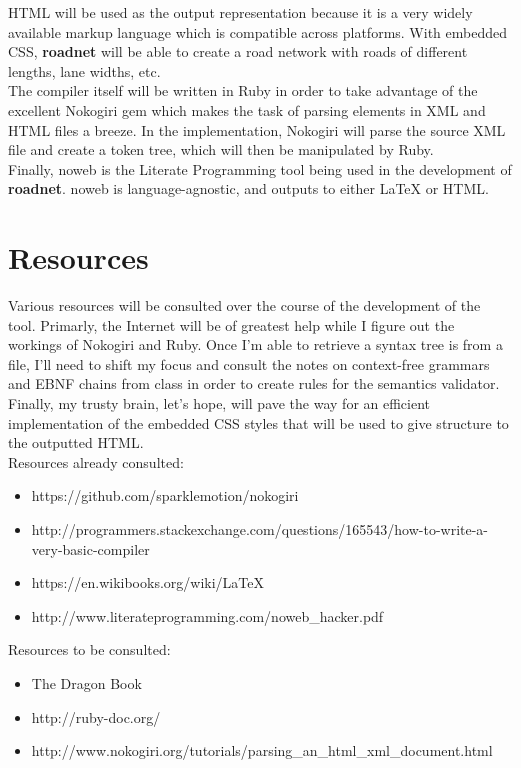 \documentclass{article}%
\begin{document}
HTML will be used as the output representation because it is a very widely available markup language which is compatible across platforms. With embedded CSS, \textbf{roadnet} will be able to create a road network with roads of different lengths, lane widths, etc.\\

The compiler itself will be written in Ruby in order to take advantage of the excellent Nokogiri gem which makes the task of parsing elements in XML and HTML files a breeze. In the implementation, Nokogiri will parse the source XML file and create a token tree, which will then be manipulated by Ruby.\\

Finally, noweb is the Literate Programming tool being used in the development of \textbf{roadnet}. noweb is language-agnostic, and outputs to either \LaTeX{} or HTML. 

\section{Resources}
Various resources will be consulted over the course of the development of the tool. Primarly, the Internet will be of greatest help while I figure out the workings of Nokogiri and Ruby. Once I'm able to retrieve a syntax tree is from a file, I'll need to shift my focus and consult the notes on context-free grammars and EBNF chains from class in order to create rules for the semantics validator. Finally, my trusty brain, let's hope, will pave the way for an efficient implementation of the embedded CSS styles that will be used to give structure to the outputted HTML.\\

Resources already consulted:
\begin{itemize}  
\item https://github.com/sparklemotion/nokogiri
\item http://programmers.stackexchange.com/questions/165543/how-to-write-a-very-basic-compiler
\item https://en.wikibooks.org/wiki/LaTeX
\item http://www.literateprogramming.com/noweb\_hacker.pdf
\end{itemize}

Resources to be consulted:
\begin{itemize}  
\item The Dragon Book
\item http://ruby-doc.org/
\item http://www.nokogiri.org/tutorials/parsing\_an\_html\_xml\_document.html
\end{itemize}
\end{document}
